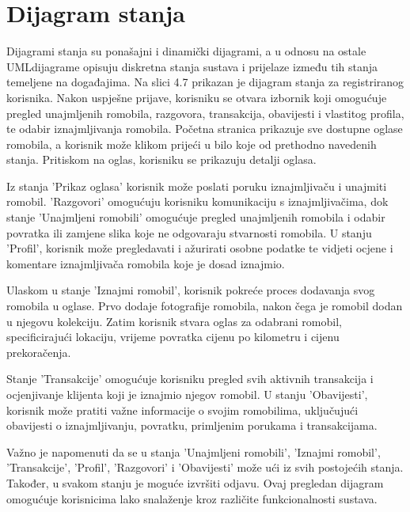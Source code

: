 			
			\eject
		
		\section{Dijagram stanja}
			
			\indent Dijagrami stanja su ponašajni i dinamički dijagrami, a u odnosu na ostale UMLdijagrame opisuju diskretna stanja sustava i prijelaze između tih stanja temeljene na događajima. Na slici 4.7 prikazan je dijagram stanja za registriranog korisnika. Nakon uspješne prijave, korisniku se otvara izbornik koji omogućuje pregled unajmljenih romobila, razgovora, transakcija, obavijesti i vlastitog profila, te odabir iznajmljivanja romobila. Početna stranica prikazuje sve dostupne oglase romobila, a korisnik može klikom prijeći u bilo koje od prethodno navedenih stanja. 
			Pritiskom na oglas, korisniku se prikazuju detalji oglasa. 
			
			Iz stanja 'Prikaz oglasa' korisnik može poslati poruku iznajmljivaču i unajmiti romobil. 'Razgovori' omogućuju korisniku komunikaciju s iznajmljivačima, dok stanje 'Unajmljeni romobili' omogućuje pregled unajmljenih romobila i odabir povratka ili zamjene slika koje ne odgovaraju stvarnosti romobila. U stanju 'Profil', korisnik može pregledavati i ažurirati osobne podatke te vidjeti ocjene i komentare iznajmljivača romobila koje je dosad iznajmio.
			
			Ulaskom u stanje 'Iznajmi romobil', korisnik pokreće proces dodavanja svog romobila u oglase. Prvo dodaje fotografije romobila, nakon čega je romobil dodan u njegovu kolekciju. Zatim korisnik stvara oglas za odabrani romobil, specificirajući lokaciju, vrijeme povratka cijenu po kilometru i cijenu prekoračenja.
			
			Stanje 'Transakcije' omogućuje korisniku pregled svih aktivnih transakcija i ocjenjivanje 
			klijenta koji je iznajmio njegov romobil. U stanju 'Obavijesti', korisnik može pratiti važne informacije o svojim romobilima, 
			uključujući obavijesti o iznajmljivanju, povratku, primljenim porukama i transakcijama. 
			
			Važno je napomenuti da se u stanja 'Unajmljeni romobili', 'Iznajmi romobil', 'Transakcije', 
			'Profil', 'Razgovori' i 'Obavijesti' može ući iz svih postojećih stanja. Također, u svakom 
			stanju je moguće izvršiti odjavu. Ovaj pregledan dijagram omogućuje korisnicima lako 
			snalaženje kroz različite funkcionalnosti sustava.
			\\
			
